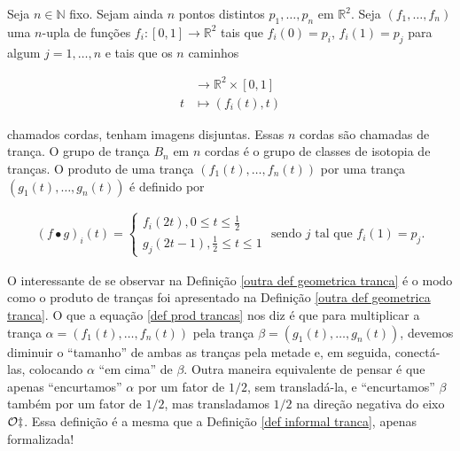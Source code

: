 	\begin{deff}
		\label{outra def geometrica tranca}
		Seja $n\in\mathbb{N}$ fixo. Sejam ainda $n$ pontos distintos $p_1, \dots, p_n$ em $\mathbb{R}^2$. Seja $(f_1, \dots, f_n)$ uma $n$-upla de funções $f_i:[0,1]\to\mathbb{R}^2$ tais que $f_i(0) = p_i$, $f_i(1) = p_j$ para algum $j=1,\dots,n$ e tais que os $n$ caminhos 
		
		\begin{align*}
		[0,1]&\to\mathbb{R}^2\times[0,1] \\
		t&\mapsto (f_i(t), t)
		\end{align*}
		
		\par\vspace{0.3cm} chamados cordas, tenham imagens disjuntas. Essas $n$ cordas são chamadas de trança. O grupo de trança $B_n$ em $n$ cordas é o grupo de classes de isotopia de tranças. O produto de uma trança $( f_1(t), \dots, f_n(t) )$ por uma trança $( g_1(t), \dots, g_n(t) )$ é definido por
		
		\begin{align}
		\label{def prod trancas}
		(f\bullet g)_i(t) = \begin{cases}
		f_i(2t), 0\leq t\leq \displaystyle{\frac{1}{2}} \\
		g_j(2t-1), \displaystyle{\frac{1}{2}}\leq t\leq 1
		\end{cases}\text{ sendo } j \text{ tal que }f_i(1) = p_j.
		\end{align}
		
	\end{deff}
	
	\par\vspace{0.3cm} O interessante de se observar na Definição \eqref{outra def geometrica tranca} é o modo como o produto de tranças foi apresentado na Definição \eqref{outra def geometrica tranca}. O que a equação \eqref{def prod trancas} nos diz é que para multiplicar a trança $\alpha = ( f_1(t), \dots, f_n(t) )$ pela trança $\beta = ( g_1(t), \dots, g_n(t) )$, devemos diminuir o ``tamanho'' de ambas as tranças pela metade e, em seguida, conectá-las, colocando $\alpha$ ``em cima'' de $\beta$. Outra maneira equivalente de pensar é que apenas ``encurtamos'' $\alpha$ por um fator de $1/2$, sem transladá-la, e ``encurtamos'' $\beta$ também por um fator de $1/2$, mas transladamos $1/2$ na direção negativa do eixo $\cal{O}z$. Essa definição é a mesma que a Definição \eqref{def informal tranca}, apenas formalizada!